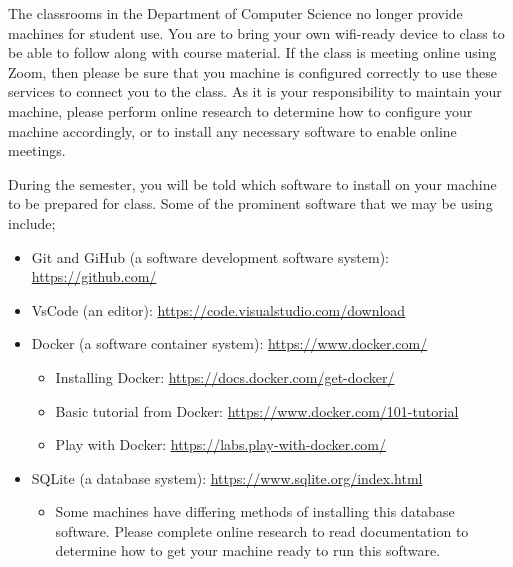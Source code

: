 \documentclass[11pt]{article} %
\begin{document}
The classrooms in the Department of Computer Science no longer provide machines for student use. You are to bring your own wifi-ready device to class to be able to follow along with course material. If the class is meeting online using Zoom, then please be sure that you machine is configured correctly to use these services to connect you to the class. As it is your responsibility to maintain your machine, please perform online research to determine how to configure your machine accordingly, or to install any necessary software to enable online meetings. 

During the semester, you will be told which software to install on your machine to be prepared for class. Some of the prominent software that we may be using include;

\begin{itemize}
\item Git and GiHub (a software development software system): \url{https://github.com/}
\item VsCode (an editor): \url{https://code.visualstudio.com/download}
\item Docker (a software container system): \url{https://www.docker.com/}
	\begin{itemize}
		\item Installing Docker: \url{https://docs.docker.com/get-docker/}
		\item Basic tutorial from Docker: \url{https://www.docker.com/101-tutorial}
		\item Play with Docker: \url{https://labs.play-with-docker.com/}
	\end{itemize}
	\item SQLite (a database system): \url{https://www.sqlite.org/index.html}
	\begin{itemize}
		\item Some machines have differing methods of installing this database software. Please complete online research to read documentation to determine how to get your machine ready to run this software. 
	\end{itemize}
\end{itemize}











\vspace{-.10in}
\end{document}
